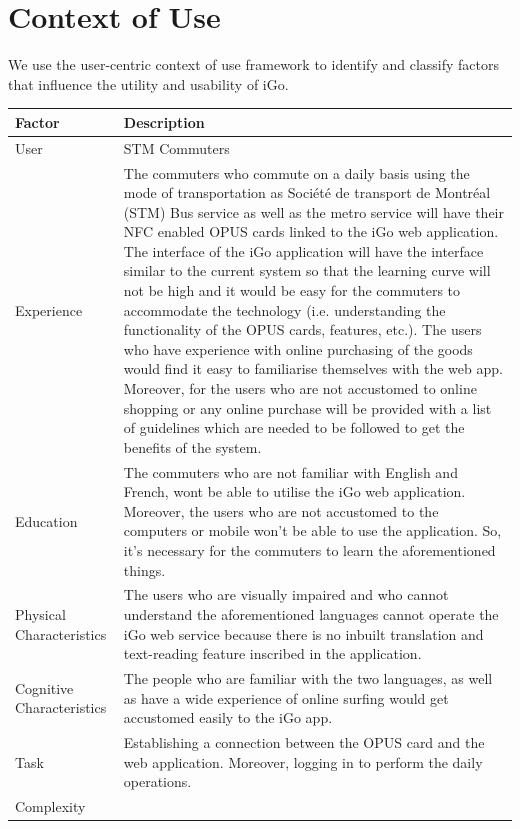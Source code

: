 \documentclass[11pt, english]{report}
\begin{document}
\chapter{Context of Use}
We use the user-centric context of use framework \cite{contextofusecasekamthan}  to identify and classify factors that influence the utility and usability of iGo.\\

\setlength{\tabcolsep}{18pt}
\renewcommand{\arraystretch}{1.5}
\begin{longtable}[!htbp]{ |p{3cm}|p{12cm}| }
\hline
Factor   & Description  \\
\hline

User &  STM Commuters \\
\hline
Experience & 


The commuters who commute on a daily basis using the mode of transportation as Société de transport de Montréal (STM) Bus service as well as the metro service will have their NFC enabled OPUS cards linked to the iGo web application. The interface of the iGo application will have the interface similar to the current system so that the learning curve will not be high and it would be easy for the commuters to accommodate the technology (i.e. understanding the functionality of the OPUS cards, features, etc.). The users who have experience with online purchasing of the goods would find it easy to familiarise themselves with the web app. Moreover, for the users who are not accustomed to online shopping or any online purchase will be provided with a list of guidelines which are needed to be followed to get the benefits of the system.

    \\
\hline
Education &

The commuters who are not familiar with English and French, wont be able to utilise the iGo web application. Moreover, the users who are not accustomed to the computers or mobile won't be able to use the application. So, it's necessary for the commuters to learn the aforementioned things.

 \\
 \hline
Physical Characteristics    &
The users who are visually impaired and who cannot understand the aforementioned languages cannot operate the iGo web service because there is no inbuilt translation and text-reading feature inscribed in the application.
  \\
  \hline
Cognitive Characteristics & 

The people who are familiar with the two languages, as well as have a wide experience of online surfing would get accustomed easily to the iGo app.
  \\
 \hline
Task &  Establishing a connection between the OPUS card and the web application. Moreover, logging in to perform the daily operations.\\
\hline
Complexity &


\end{longtable}
\end{document}
